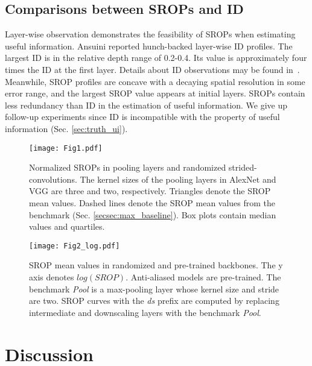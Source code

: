 \documentclass{article}
\begin{document}
\subsection{Comparisons between SROPs and ID}\label{subsec:compar}
Layer-wise observation demonstrates the feasibility of SROPs when estimating useful information. Ansuini \etal reported hunch-backed layer-wise ID profiles. The largest ID is in the relative depth range of 0.2-0.4. Its value is approximately four times the ID at the first layer. Details about ID observations may be found in~\cite{Intrinsic_dimension_of_data_representation}. Meanwhile, SROP profiles are concave with a decaying spatial resolution in some error range, and the largest SROP value appears at initial layers. SROPs contain less redundancy than ID in the estimation of useful information. We give up follow-up experiments since ID is incompatible with the property of useful information (Sec. \ref{sec:truth_ui}).

\begin{figure}
    \begin{center}
    \texttt{[image: Fig1.pdf]}
    \end{center}
    \caption{Normalized SROPs in pooling layers and randomized strided-convolutions. The kernel sizes of the pooling layers in AlexNet and VGG are three and two, respectively. Triangles denote the SROP mean values. Dashed lines denote the SROP mean values from the benchmark (Sec. \ref{secsec:max_baseline}). Box plots contain median values and quartiles.}
    \label{fig:base}
\end{figure}

\begin{figure*}
    \begin{center}
    \texttt{[image: Fig2\_log.pdf]}
    \end{center}
    \caption{SROP mean values in randomized and pre-trained backbones. The y axis denotes $log (SROP)$. Anti-aliased models are pre-trained. The benchmark \textit{Pool} is a max-pooling layer whose kernel size and stride are two. SROP curves with the \textit{ds} prefix are computed by replacing intermediate and downscaling layers with the benchmark \textit{Pool}.}
    \label{fig:flow}
\end{figure*}
\section{Discussion}
\label{sec:discussion}
\end{document}
